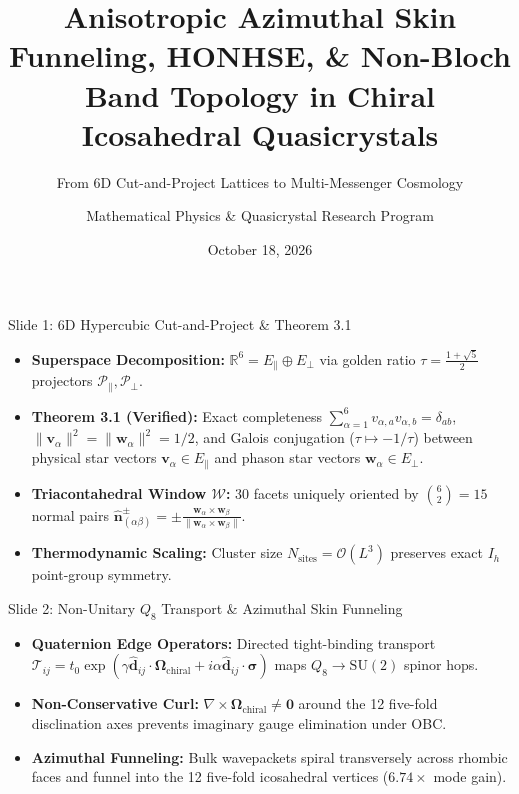 \documentclass[aspectratio=169,10pt]{beamer}
\title[HONHSE \& Cosmology]{Anisotropic Azimuthal Skin Funneling, HONHSE, \& Non-Bloch Band Topology in Chiral Icosahedral Quasicrystals}
\subtitle{From 6D Cut-and-Project Lattices to Multi-Messenger Cosmology}
\author{Mathematical Physics \& Quasicrystal Research Program}
\date{October 18, 2026}
\begin{document}
\begin{frame}
\titlepage
\end{frame}

\begin{frame}{Slide 1: 6D Hypercubic Cut-and-Project \& Theorem 3.1}
\begin{itemize}
\item \textbf{Superspace Decomposition:} $\mathbb{R}^6 = E_\parallel \oplus E_\perp$ via golden ratio $\tau = \frac{1+\sqrt{5}}{2}$ projectors $\mathcal{P}_\parallel, \mathcal{P}_\perp$.
\item \textbf{Theorem 3.1 (Verified):} Exact completeness $\sum_{\alpha=1}^6 v_{\alpha,a}v_{\alpha,b} = \delta_{ab}$, $\|\bm{v}_\alpha\|^2 = \|\bm{w}_\alpha\|^2 = 1/2$, and Galois conjugation ($\tau \mapsto -1/\tau$) between physical star vectors $\bm{v}_\alpha \in E_\parallel$ and phason star vectors $\bm{w}_\alpha \in E_\perp$.
\item \textbf{Triacontahedral Window $\mathcal{W}$:} 30 facets uniquely oriented by $\binom{6}{2}=15$ normal pairs $\hat{\bm{n}}_{(\alpha\beta)}^\pm = \pm \frac{\bm{w}_\alpha \times \bm{w}_\beta}{\|\bm{w}_\alpha \times \bm{w}_\beta\|}$.
\item \textbf{Thermodynamic Scaling:} Cluster size $N_{\mathrm{sites}} = \mathcal{O}(L^3)$ preserves exact $I_h$ point-group symmetry.
\end{itemize}
\end{frame}

\begin{frame}{Slide 2: Non-Unitary $Q_8$ Transport \& Azimuthal Skin Funneling}
\begin{itemize}
\item \textbf{Quaternion Edge Operators:} Directed tight-binding transport $\mathcal{T}_{ij} = t_0 \exp(\gamma\hat{\bm{d}}_{ij}\cdot\bm{\Omega}_{\mathrm{chiral}} + i\alpha\hat{\bm{d}}_{ij}\cdot\bm{\sigma})$ maps $Q_8 \to \mathrm{SU}(2)$ spinor hops.
\item \textbf{Non-Conservative Curl:} $\nabla \times \bm{\Omega}_{\mathrm{chiral}} \neq \bm{0}$ around the 12 five-fold disclination axes prevents imaginary gauge elimination under OBC.
\item \textbf{Azimuthal Funneling:} Bulk wavepackets spiral transversely across rhombic faces and funnel into the 12 five-fold icosahedral vertices ($6.74\times$ mode gain).
\end{itemize}
\end{frame}
\end{document}
